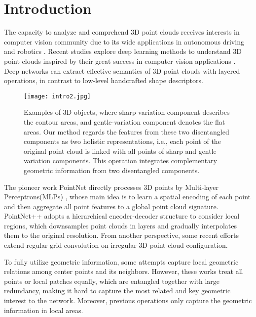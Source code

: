 \documentclass[letterpaper]{article} \usepackage{aaai21}  \usepackage{times}  \usepackage{helvet} \usepackage{courier}  \usepackage[hyphens]{url}  \usepackage{graphicx} \urlstyle{rm} \def\UrlFont{\rm}  \usepackage{natbib}  \usepackage{caption} \frenchspacing  \setlength{\pdfpagewidth}{8.5in}  \setlength{\pdfpageheight}{11in}  \usepackage{color}
\begin{document}
\section{Introduction}
The capacity to analyze and comprehend 3D point clouds receives interests in computer vision community due to its wide applications in autonomous driving and robotics \cite{rusu2008towards,qi2018frustum}. Recent studies explore deep learning methods to understand 3D point clouds inspired by their great success in computer vision applications \cite{He_2015_ICCV,He_2016_CVPR}. Deep networks \cite{7569026} can extract effective semantics of 3D point clouds with layered operations, in contrast to low-level handcrafted shape descriptors. 
\begin{figure}[t]
	\setlength{\abovecaptionskip}{0cm} 
	\begin{center}
	\texttt{[image: intro2.jpg]} \end{center}
	\caption{Examples of 3D objects, where sharp-variation component describes the contour areas, and gentle-variation component denotes the flat areas. Our method regards the features from these two disentangled components as two holistic representations, i.e., each point of the original point cloud is linked with all points of sharp and gentle variation components. This operation integrates complementary geometric information from two disentangled components.}
	\label{first}
\end{figure}
The pioneer work PointNet \cite{Qi_2017_CVPR} directly processes 3D points by Multi-layer Perceptrons(MLPs) \cite{MLP}, whose main idea is to learn a spatial encoding of each point and then aggregate all point features to a global point cloud signature. PointNet++ \cite{NIPS2017_7095} adopts a hierarchical encoder-decoder structure to consider local regions, which downsamples point clouds in layers and gradually interpolates them to the original resolution. From another perspective, some recent efforts extend regular grid convolution \cite{Xu_2018_ECCV,NIPS2018_7362,thomas2019KPConv} on irregular 3D point cloud configuration. 

To fully utilize geometric information, some attempts \cite{Wang:2019:DGC:3341165.3326362,Lan_2019_CVPR} capture local geometric relations among center points and its neighbors. However, these works treat all points or local patches equally, which are entangled together with large redundancy, making it hard to capture the most related and key geometric interest to the network. Moreover, previous operations only capture the geometric information in local areas.
\end{document}
